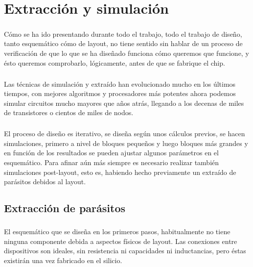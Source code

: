 \chapter{Extracción y simulación}

\paragraph{}
Cómo se ha ido presentando durante todo el trabajo, todo el trabajo de diseño,
tanto esquemático cómo de layout, no tiene sentido sin hablar de un proceso de
verificación de que lo que se ha diseñado funciona cómo queremos que funcione,
y ésto queremos comprobarlo, lógicamente, antes de que se fabrique el chip.

\paragraph{}
Las técnicas de simulación y extraído han evolucionado mucho en los últimos tiempos,
con mejores algoritmos y procesadores más potentes ahora podemos simular circuitos
mucho mayores que años atrás, llegando a los decenas de miles de transistores o
cientos de miles de nodos.

\paragraph{}
El proceso de diseño es iterativo, se diseña según unos cálculos previos, se hacen
simulaciones, primero a nivel de bloques pequeños y luego bloques más grandes y
en función de los resultados se pueden ajustar algunos parámetros en el esquemático.
Para afinar aún más siempre es necesario realizar también simulaciones post-layout,
esto es, habiendo hecho previamente un extraído de parásitos debidos al layout.

\section{Extracción de parásitos}\label{cap:extraccion}

\paragraph{}
El esquemático que se diseña en los primeros pasos, habitualmente no tiene ninguna
componente debida a aspectos físicos de layout. Las conexiones entre dispositivos
son ideales, sin resistencia ni capacidades ni inductancias, pero éstas existirán
una vez fabricado en el silicio.

